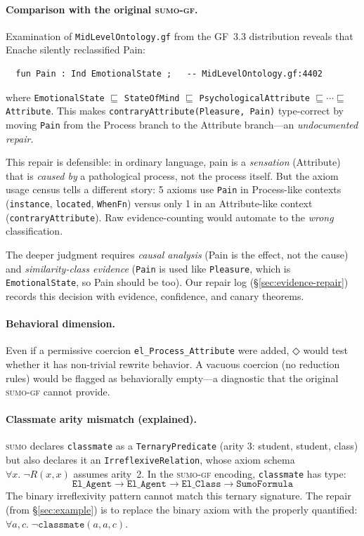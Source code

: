 \documentclass[11pt]{article}
\newcommand{\DiamondOp}{\mathbin{\Diamond}}
\newcommand{\SUMO}{\textsc{sumo}}
\newcommand{\GF}{\textsc{gf}}
\theoremstyle{definition}
\theoremstyle{plain}
\begin{document}
\paragraph{Comparison with the original \SUMO{}-\GF{}.}
Examination of \texttt{MidLevelOntology.gf} from the GF~3.3
distribution reveals that Enache silently reclassified Pain:
\begin{verbatim}
  fun Pain : Ind EmotionalState ;   -- MidLevelOntology.gf:4402
\end{verbatim}
where \texttt{EmotionalState} $\sqsubseteq$ \texttt{StateOfMind}
$\sqsubseteq$ \texttt{PsychologicalAttribute} $\sqsubseteq \cdots
\sqsubseteq$ \texttt{Attribute}.  This makes
\texttt{contraryAttribute(Pleasure, Pain)} type-correct by moving
\texttt{Pain} from the Process branch to the Attribute branch---an
\emph{undocumented repair}.

This repair is defensible: in ordinary language, pain is a
\emph{sensation} (Attribute) that is \emph{caused by} a pathological
process, not the process itself.  But the axiom usage census tells
a different story: 5 axioms use \texttt{Pain} in Process-like
contexts (\texttt{instance}, \texttt{located}, \texttt{WhenFn})
versus only 1 in an Attribute-like context
(\texttt{contraryAttribute}).  Raw evidence-counting would automate
to the \emph{wrong} classification.

The deeper judgment requires \emph{causal analysis} (Pain is the
effect, not the cause) and \emph{similarity-class evidence}
(\texttt{Pain} is used like \texttt{Pleasure}, which is
\texttt{EmotionalState}, so Pain should be too).  Our repair log
(\S\ref{sec:evidence-repair}) records this decision with evidence,
confidence, and canary theorems.

\paragraph{Behavioral dimension.}
Even if a permissive coercion \texttt{el\_Process\_Attribute} were
added, $\DiamondOp$ would test whether it has non-trivial rewrite
behavior.  A vacuous coercion (no reduction rules) would be flagged
as behaviorally empty---a diagnostic that the original \SUMO{}-\GF{}
cannot provide.

\paragraph{Classmate arity mismatch (explained).}
\SUMO{} declares \texttt{classmate} as a \texttt{TernaryPredicate}
(arity 3: student, student, class) but also declares it an
\texttt{IrreflexiveRelation}, whose axiom schema
$\forall x.\;\lnot R(x,x)$ assumes arity~2.  In the \SUMO{}-\GF{}
encoding, \texttt{classmate} has type:
\[
  \texttt{El\_Agent} \to \texttt{El\_Agent} \to \texttt{El\_Class}
    \to \texttt{SumoFormula}
\]
The binary irreflexivity pattern cannot match this ternary signature.
The repair (from \S\ref{sec:example}) is to replace the binary
axiom with the properly quantified:
$\forall a,c.\;\lnot\texttt{classmate}(a, a, c)$.
\end{document}
